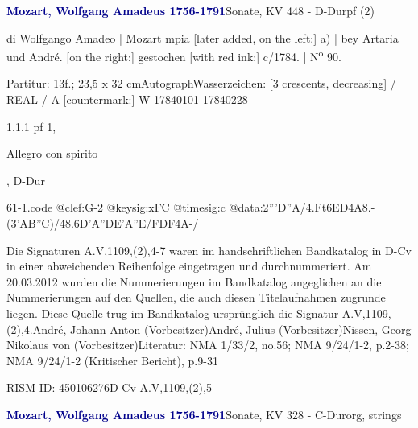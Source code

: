 \documentclass[a4paper, twocolumn, 11pt]{book}
\begin{document}
\par \vspace{16pt} \textcolor{darkblue}{\textbf{Mozart, Wolfgang Amadeus  1756-1791}}\hfillplus{[61]}\newline Sonate, KV 448 - D-Dur\newline pf (2)
\par \begin{itshape} di Wolfgango Amadeo | Mozart mpia [later added, on the left:] a) | bey Artaria und André. [on the right:] gestochen [with red ink:] c/1784. | N\textsuperscript{o} 90.\end{itshape} 
\par \textcolor{darkblue}{}  Partitur: 13f.; 23,5 x 32 cm\newline Autograph\newline Wasserzeichen: [3 crescents, decreasing] / REAL / A [countermark:] W  17840101-17840228
\par 1.1.1  pf 1, \begin{itshape}Allegro con spirito\end{itshape}, D-Dur  
\begin{filecontents*}{61-1.code}
@clef:G-2
@keysig:xFC
@timesig:c
@data:2'''D''A/4.Ft{6ED}4A8.-(3{'AB''C})/48.6D'{A''D}E{'A''E}/F{DF}4A-/
\end{filecontents*}
\newline %
\par Die Signaturen A.V,1109,(2),4-7 waren im handschriftlichen Bandkatalog in D-Cv in einer abweichenden Reihenfolge eingetragen und durchnummeriert. Am 20.03.2012 wurden die Nummerierungen im Bandkatalog angeglichen an die Nummerierungen auf den Quellen, die auch diesen Titelaufnahmen zugrunde liegen. Diese Quelle trug im Bandkatalog ursprünglich die Signatur A.V,1109,(2),4.\newline André, Johann Anton  (Vorbesitzer)\newline André, Julius  (Vorbesitzer)\newline Nissen, Georg Nikolaus von  (Vorbesitzer)\newline Literatur: NMA  1/33/2, no.56; NMA  9/24/1-2, p.2-38; NMA  9/24/1-2 (Kritischer Bericht), p.9-31
\par RISM-ID: 450106276\newline D-Cv  A.V,1109,(2),5
\par \vspace{16pt} \textcolor{darkblue}{\textbf{Mozart, Wolfgang Amadeus  1756-1791}}\hfillplus{[62]}\newline Sonate, KV 328 - C-Dur\newline org, strings
\end{document}
